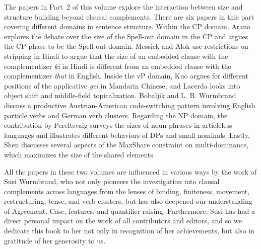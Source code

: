 The papers in Part~2 of this volume explore the interaction between size and structure building beyond clausal complements. 
There are six papers in this part covering different domains in sentence structure.
Within the CP domain, Arano explores the debate over the size of the Spell-out domain in the CP and argues the CP phase to be the Spell-out domain. 
Messick and Alok use restrictions on stripping in Hindi to argue that the size of an embedded clause with the complementizer \textit{ki} in Hindi is different from an embedded clause with the complementizer \textit{that} in English. 
Inside the vP domain, Kuo argues for different positions of the applicative \textit{gei} in Mandarin Chinese, and  
Lacerda looks into object shift and middle-field topicalization. 
Bobaljik and L. B. Wurmbrand discuss a productive Austrian-American code-switching pattern involving English particle verbs and German verb clusters. 
Regarding the NP domain, 
the contribution by Pereltsvaig surveys the sizes of noun phrases in articleless languages and illustrates different behaviors of DPs and small nominals. 
Lastly, Shen discusses several aspects of the MaxShare constraint on multi-dominance, which maximizes the size of the shared elements. 

All the papers in these two volumes are influenced in various ways by the work of Susi Wurmbrand, who not only pioneers the investigation into clausal complements across languages from the lenses of 
binding, finiteness, movement, restructuring, tense, and verb clusters, 
but has also deepened our understanding of 
Agreement, Case, features, and quantifier raising. 
Furthermore, Susi has had a direct personal impact on the work of all contributors and editors, and so we dedicate this book to her not only in recognition of her achievements, but also in gratitude of her generosity to us. 


%
	
	


	